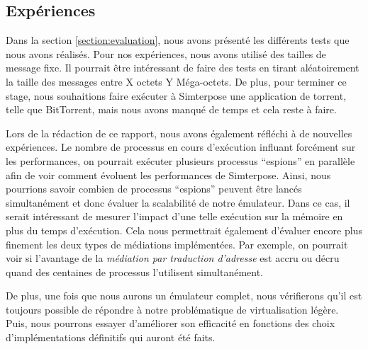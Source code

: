 \subsection{Expériences}
Dans la section \ref{section:evaluation}, nous avons présenté les différents tests que nous avons réalisés. Pour nos expériences, nous avons utilisé des tailles de message fixe. Il pourrait être intéressant de faire des tests en tirant aléatoirement la taille des messages entre X octets Y Méga-octets. De plus, pour terminer ce stage, nous souhaitions faire exécuter à Simterpose une application de torrent, telle que BitTorrent, mais nous avons manqué de temps et cela reste à faire.

Lors de la rédaction de ce rapport, nous avons également réfléchi à de nouvelles expériences. Le nombre de processus en cours d'exécution influant forcément sur les performances, on pourrait exécuter plusieurs processus ``espions'' en parallèle afin de voir comment évoluent les performances de Simterpose. Ainsi, nous pourrions savoir  combien de processus ``espions'' peuvent être lancés simultanément et donc évaluer la scalabilité de notre émulateur. Dans ce cas, il serait intéressant de mesurer l'impact d'une telle exécution sur la mémoire en plus du temps d'exécution. Cela nous permettrait également d'évaluer encore plus finement les deux types de médiations implémentées. Par exemple, on pourrait voir si l'avantage de la \textit{médiation par traduction d'adresse} est accru ou décru quand des centaines de processus l'utilisent simultanément.

De plus, une fois que nous aurons un émulateur complet, nous vérifierons qu'il est toujours possible de répondre à notre problématique de virtualisation légère. Puis, nous pourrons essayer d'améliorer son efficacité en fonctions des choix d'implémentations définitifs qui auront été faits.


